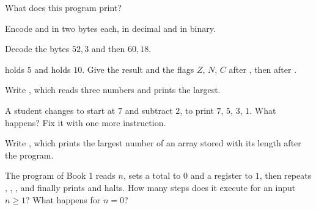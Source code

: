 \begin{exercise}[$\star$]\label{exo:g11:von-neumann-machine:1}
What does this program print?

\smallskip\noindent\hspace*{2em} \quad {} \quad {} \quad
{} \quad {}
\end{exercise}

\begin{exercise}[$\star$]\label{exo:g11:von-neumann-machine:2}
Encode  and  in two bytes each, in decimal and in binary.
\end{exercise}

\begin{exercise}[$\star$]\label{exo:g11:von-neumann-machine:3}
Decode the bytes $52, 3$ and then $60, 18$.
\end{exercise}

\begin{exercise}[$\star$]\label{exo:g11:von-neumann-machine:4}
 holds $5$ and  holds $10$. Give the result and the flags $Z$, $N$, $C$ after ,
then after .
\end{exercise}

\begin{exercise}[$\star$]\label{exo:g11:von-neumann-machine:5}
Write , which reads three numbers and prints the largest.
\end{exercise}

\begin{exercise}[$\star\star$]\label{exo:g11:von-neumann-machine:6}
A student changes  to start at $7$ and subtract $2$, to print $7$, $5$, $3$, $1$. What happens?
Fix it with one more instruction.
\end{exercise}

\begin{exercise}[$\star\star$]\label{exo:g11:von-neumann-machine:7}
Write , which prints the largest number of an array stored with its length after the program.
\end{exercise}

\begin{exercise}[$\star\star$]\label{exo:g11:von-neumann-machine:8}
The program  of Book 1 reads $n$, sets a total to $0$ and a register to $1$, then repeats
, , , and finally prints and halts. How many steps does it execute
for an input $n \ge 1$? What happens for $n = 0$?
\end{exercise}

